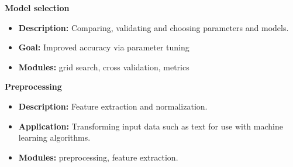 \documentclass[MASTER.tex]{subfiles}
\begin{document}
\begin{frame}
\LARGE
\textbf{Model selection}\\
\begin{itemize}
	\item \textbf{Description: } Comparing, validating and choosing parameters and models.
\item \textbf{Goal:} Improved accuracy via parameter tuning
\item \textbf{Modules:} grid search, cross validation, metrics
\end{itemize}
\end{frame}
\begin{frame}
\LARGE
\textbf{Preprocessing}\\
\begin{itemize}
\item \textbf{Description:} Feature extraction and normalization.
\item \textbf{Application:} Transforming input data such as text for use with machine learning algorithms.
\item \textbf{Modules:} preprocessing, feature extraction.
\end{itemize}
\end{frame}
\end{document}
